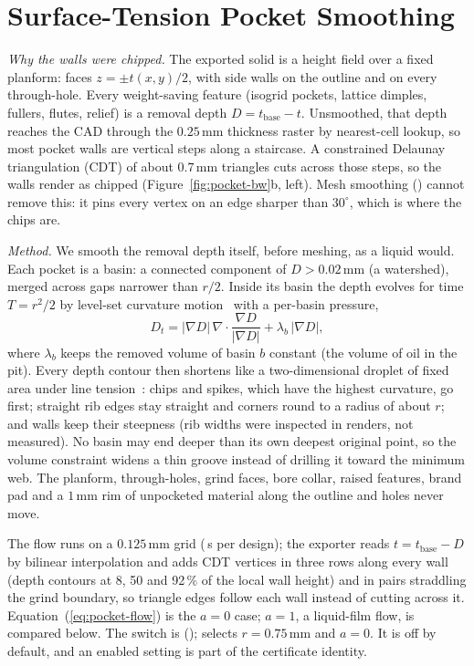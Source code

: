 \section{Surface-Tension Pocket Smoothing}
\label{sec:pocket-smoothing}

\textit{Why the walls were chipped.} The exported solid is a height field over a fixed planform: faces $z=\pm t(x,y)/2$, with side walls on the outline and on every through-hole. Every weight-saving feature (isogrid pockets, lattice dimples, fullers, flutes, relief) is a removal depth $D=t_{\mathrm{base}}-t$. Unsmoothed, that depth reaches the CAD through the $0.25\,\mathrm{mm}$ thickness raster by nearest-cell lookup, so most pocket walls are vertical steps along a staircase. A constrained Delaunay triangulation (CDT) of about $0.7\,\mathrm{mm}$ triangles cuts across those steps, so the walls render as chipped (Figure~\ref{fig:pocket-bw}b, left). Mesh smoothing () cannot remove this: it pins every vertex on an edge sharper than $30^\circ$, which is where the chips are.

\textit{Method.} We smooth the removal depth itself, before meshing, as a liquid would. Each pocket is a basin: a connected component of $D>0.02\,\mathrm{mm}$ (a watershed), merged across gaps narrower than $r/2$. Inside its basin the depth evolves for time $T=r^2/2$ by level-set curvature motion~\cite{osher1988} with a per-basin pressure,
\begin{equation}
\label{eq:pocket-flow}
D_t=|\nabla D|\,\nabla\!\cdot\!\frac{\nabla D}{|\nabla D|}+\lambda_b\,|\nabla D|,
\end{equation}
where $\lambda_b$ keeps the removed volume of basin $b$ constant (the volume of oil in the pit). Every depth contour then shortens like a two-dimensional droplet of fixed area under line tension~\cite{gagehamilton1986}: chips and spikes, which have the highest curvature, go first; straight rib edges stay straight and corners round to a radius of about $r$; and walls keep their steepness (rib widths were inspected in renders, not measured). No basin may end deeper than its own deepest original point, so the volume constraint widens a thin groove instead of drilling it toward the minimum web. The planform, through-holes, grind faces, bore collar, raised features, brand pad and a $1\,\mathrm{mm}$ rim of unpocketed material along the outline and holes never move.

The flow runs on a $0.125\,\mathrm{mm}$ grid (\PocketSecondsRange\,s per design); the exporter reads $t=t_{\mathrm{base}}-D$ by bilinear interpolation and adds CDT vertices in three rows along every wall (depth contours at 8, 50 and 92\,\% of the local wall height) and in pairs straddling the grind boundary, so triangle edges follow each wall instead of cutting across it. Equation~(\ref{eq:pocket-flow}) is the $a=0$ case; $a=1$, a liquid-film flow, is compared below. The switch is  ();  selects $r=0.75\,\mathrm{mm}$ and $a=0$. It is off by default, and an enabled setting is part of the certificate identity.

